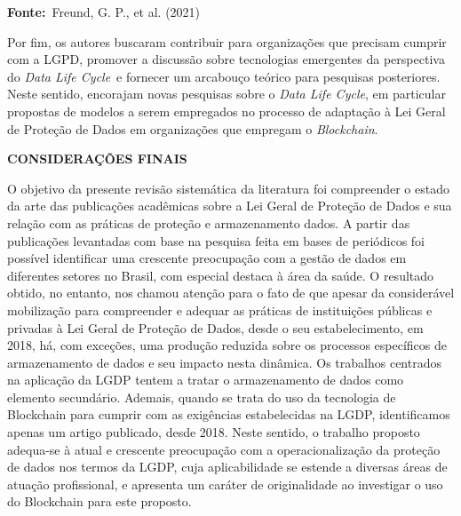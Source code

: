  \textbf{\textbf{Fonte:}} Freund, G. P., et al. (2021)

 Por fim, os autores buscaram contribuir para organizações que precisam cumprir com a LGPD, promover a discussão sobre tecnologias emergentes da perspectiva do \textit{\textit{Data Life Cycle}} e fornecer um arcabouço teórico para pesquisas posteriores. Neste sentido, encorajam novas pesquisas sobre o \textit{\textit{Data Life Cycle}}, em particular propostas de modelos a serem empregados no processo de adaptação à Lei Geral de Proteção de Dados em organizações que empregam o \textit{\textit{Blockchain}}. 

 \textbf{\textbf{CONSIDERAÇÕES FINAIS}}

O objetivo da presente revisão sistemática da literatura foi compreender o estado da arte das publicações acadêmicas sobre a Lei Geral de Proteção de Dados e sua relação com as práticas de proteção e armazenamento dados. A partir das publicações levantadas com base na pesquisa feita em bases de periódicos foi possível identificar uma crescente preocupação com a gestão de dados em diferentes setores no Brasil, com especial destaca à área da saúde. O resultado obtido, no entanto, nos chamou atenção para o fato de que apesar da considerável mobilização para compreender e adequar as práticas de instituições públicas e privadas à Lei Geral de Proteção de Dados, desde o seu estabelecimento, em 2018, há, com exceções, uma produção reduzida sobre os processos específicos de armazenamento de dados e seu impacto nesta dinâmica. Os trabalhos centrados na aplicação da LGDP tentem a tratar o armazenamento de dados como elemento secundário. Ademais, quando se trata do uso da tecnologia de Blockchain para cumprir com as exigências estabelecidas na LGDP, identificamos apenas um artigo publicado, desde 2018. Neste sentido, o trabalho proposto adequa-se à atual e crescente preocupação com a operacionalização da proteção de dados nos termos da LGDP, cuja aplicabilidade se estende a diversas áreas de atuação profissional, e apresenta um caráter de originalidade ao investigar o uso do Blockchain para este proposto. 